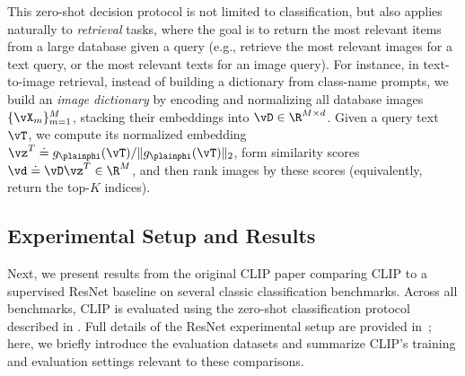 \documentclass[../../book-main.tex]{subfiles}
\begin{document}
This zero-shot decision protocol is not limited to classification,
but also applies naturally to \emph{retrieval} tasks,
where the goal is to return the most relevant items from a large
database given a query (e.g., retrieve the most
relevant images for a text query, or the most relevant texts for an
image query). For instance, in text-to-image
retrieval, instead of building a dictionary from class-name prompts,
we build an \emph{image dictionary} by encoding
and normalizing all database images \(\{\vX_m\}_{m=1}^{M}\), stacking
their embeddings into
\(\vD\in\R^{M\times d}\). Given a query text \(\vT\), we compute its
normalized embedding
\(\vz^T \doteq g_{\plainphi}(\vT)/\|g_{\plainphi}(\vT)\|_2\), form
similarity scores
\(\vd \doteq \vD\vz^T\in\R^{M}\), and then rank images by these
scores (equivalently, return the top-\(K\)
indices).

\subsection{Experimental Setup and Results}

Next, we present results from the original CLIP paper comparing CLIP
to a supervised ResNet baseline on several classic classification
benchmarks. Across all benchmarks, CLIP is evaluated using the
zero-shot classification protocol described in .
Full details of the ResNet experimental setup are provided
in~\citep{He2016-lc}; here, we briefly introduce the evaluation
datasets and summarize CLIP’s training and evaluation settings
relevant to these comparisons.
\end{document}
